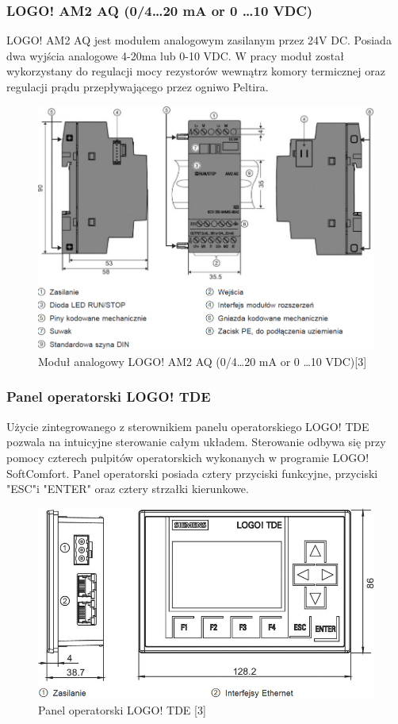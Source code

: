\documentclass[oneside]{mgr}
\begin{document}
\subsubsection{LOGO! AM2 AQ (0/4\dots20 mA or 0 \dots 10 VDC)}
LOGO! AM2 AQ jest modułem analogowym zasilanym przez 24V DC. Posiada dwa wyjścia analogowe 4-20ma lub 0-10 VDC. W pracy moduł został wykorzystany do regulacji mocy rezystorów wewnątrz komory termicznej oraz regulacji prądu przepływającego przez ogniwo Peltira.

\begin{figure}
    \centering
    \includegraphics[width=\textwidth]{Modul_analogowy.PNG}
    \caption{Moduł analogowy LOGO! AM2 AQ (0/4\dots20 mA or 0 \dots 10 VDC)[3]}
\end{figure}

\subsubsection{Panel operatorski LOGO! TDE}

Użycie zintegrowanego z sterownikiem panelu operatorskiego LOGO! TDE pozwala na intuicyjne sterowanie całym układem. Sterowanie odbywa się przy pomocy czterech pulpitów operatorskich wykonanych w programie LOGO! SoftComfort. Panel operatorski posiada cztery przyciski funkcyjne, przyciski "ESC"i "ENTER" oraz cztery strzałki kierunkowe.

\begin{figure}
    \centering
    \includegraphics[width=\textwidth]{HMI.PNG}
    \caption{Panel operatorski LOGO! TDE [3]}
\end{figure}
\end{document}
